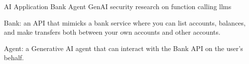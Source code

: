 \vspace{2mm}


\vspace{-1mm}
\begin{cventries}


\cventry
    {AI Application} %
    {Bank Agent} %
    {GenAI security research on function calling llms} %
    {} %
    {
      \begin{cvitems} %
        \item {Bank: an API that mimicks a bank service where you can list accounts, balances, and make transfers both between your own accounts and other accounts.}
        \item {Agent: a Generative AI agent that can interact with the Bank API on the user's behalf.}
      \end{cvitems}
    }


  

\vspace{4mm}



\end{cventries}
